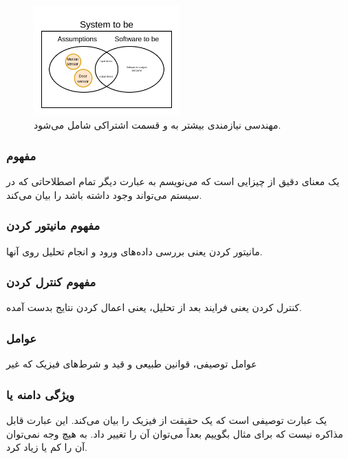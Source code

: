 \begin{figure}[H]
    \centering
    \includegraphics[width=0.5\textwidth]{images/system_to_be.png}
    \caption{مهندسی نیازمندی بیشتر به  و قسمت اشتراکی شامل می‌شود.}
    \label{fig: systemToBe}
\end{figure}

\subsubsection{مفهوم }

یک معنای دقیق از چیزایی است که می‌نویسم به عبارت دیگر تمام اصطلاحاتی که در سیستم
می‌تواند وجود داشته باشد را بیان می‌کند.

\subsubsection{مفهوم مانیتور کردن}

مانیتور کردن یعنی بررسی داده‌های ورود و انجام تحلیل روی آنها.

\subsubsection{مفهوم کنترل کردن}

کنترل کردن یعنی فرایند بعد از تحلیل، یعنی اعمال کردن نتایج بدست آمده.

\subsubsection{عوامل }

عوامل توصیفی، قوانین طبیعی و قید و شرط‌های فیزیک که غیر 

\subsubsection{ویژگی دامنه یا }

یک عبارت توصیفی است که یک حقیقت از فیزیک را بیان می‌کند. این عبارت قابل مذاکره
نیست که برای مثال بگوییم بعداً می‌توان آن را تغییر داد. به هیچ وجه نمی‌توان آن
را کم یا زیاد کرد.

